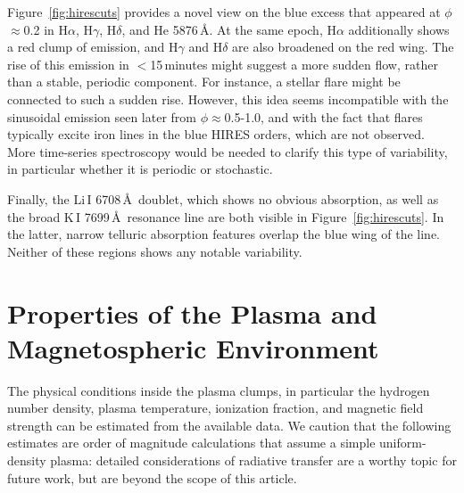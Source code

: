 \documentclass[11pt,twocolumn,tighten,linenumbers]{aastex7}
\begin{document}
Figure~\ref{fig:hirescuts} provides a novel view on the
blue excess that appeared at $\phi$$\approx$0.2 in H$\alpha$,
H$\gamma$, H$\delta$, and He 5876\,\AA.  At the same epoch, H$\alpha$
additionally shows a red clump of emission, and H$\gamma$ and
H$\delta$ are also broadened on the red wing.  The rise of this
emission in $<$15\,minutes might suggest a more sudden flow, rather
than a stable, periodic component.  For instance, a stellar flare
might be connected to such a sudden rise.  However, this idea seems
incompatible with the sinusoidal emission seen later from
$\phi$$\approx$0.5-1.0, and with the fact that flares typically excite
iron lines in the blue HIRES orders, which are not observed.  More
time-series spectroscopy would be needed to clarify this type of
variability, in particular whether it is periodic or stochastic.

Finally, the Li\,\textsc{I} 6708\,\AA\ doublet, which shows no obvious
absorption, as well as the broad K\,\textsc{I} 7699\,\AA\ resonance
line are both visible in Figure~\ref{fig:hirescuts}.  In
the latter, narrow telluric absorption features overlap the blue wing
of the line.  Neither of these regions shows any notable variability.






\section{Properties of the Plasma and Magnetospheric Environment}
\label{subsec:gas}

The physical conditions inside the plasma clumps, in particular the
hydrogen number density, plasma temperature, ionization fraction, and
magnetic field strength can be estimated from the available data.  We
caution that the following estimates are order of magnitude
calculations that assume a simple uniform-density plasma: detailed
considerations of radiative transfer are a worthy topic for future
work, but are beyond the scope of this article.
\end{document}
